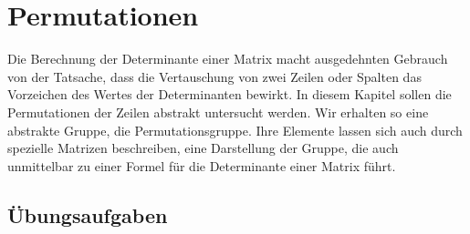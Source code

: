 %
%
%
\chapter{Permutationen
\label{buch:chapter:permutationen}}
\rhead{}
Die Berechnung der Determinante einer Matrix macht ausgedehnten
Gebrauch von der Tatsache, dass die Vertauschung von zwei Zeilen
oder Spalten das Vorzeichen des Wertes der Determinanten bewirkt.
In diesem Kapitel sollen die Permutationen der Zeilen abstrakt
untersucht werden.
Wir erhalten so eine abstrakte Gruppe, die Permutationsgruppe.
Ihre Elemente lassen sich auch durch spezielle Matrizen beschreiben,
eine Darstellung der Gruppe, die auch unmittelbar zu einer 
Formel für die Determinante einer Matrix führt.






\section*{Übungsaufgaben}
\begin{uebungsaufgaben}
\end{uebungsaufgaben}

